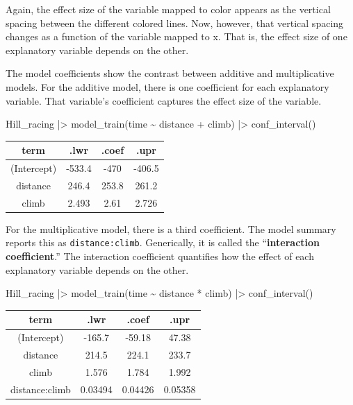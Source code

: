 \documentclass[
  letterpaper,
  DIV=11,
  numbers=noendperiod,
  oneside]{scrartcl}
\newenvironment{Shaded}{\begin{snugshade}}{\end{snugshade}}
\newcommand{\FunctionTok}[1]{\textcolor[rgb]{0.28,0.35,0.67}{#1}}
\newcommand{\NormalTok}[1]{\textcolor[rgb]{0.00,0.23,0.31}{#1}}
\newcommand{\SpecialCharTok}[1]{\textcolor[rgb]{0.37,0.37,0.37}{#1}}
\begin{document}
Again, the effect size of the variable mapped to color appears as the
vertical spacing between the different colored lines. Now, however, that
vertical spacing changes as a function of the variable mapped to x. That
is, the effect size of one explanatory variable depends on the other.

The model coefficients show the contrast between additive and
multiplicative models. For the additive model, there is one coefficient
for each explanatory variable. That variable's coefficient captures the
effect size of the variable.

\begin{Shaded}
\begin{Highlighting}[]
\NormalTok{Hill\_racing }\SpecialCharTok{|\textgreater{}} \FunctionTok{model\_train}\NormalTok{(time }\SpecialCharTok{\textasciitilde{}}\NormalTok{ distance }\SpecialCharTok{+}\NormalTok{ climb) }\SpecialCharTok{|\textgreater{}} \FunctionTok{conf\_interval}\NormalTok{()}
\end{Highlighting}
\end{Shaded}

\begin{longtable}[]{@{}cccc@{}}
\toprule\noalign{}
term & .lwr & .coef & .upr \\
\midrule\noalign{}
\endhead
\bottomrule\noalign{}
\endlastfoot
(Intercept) & -533.4 & -470 & -406.5 \\
distance & 246.4 & 253.8 & 261.2 \\
climb & 2.493 & 2.61 & 2.726 \\
\end{longtable}

For the multiplicative model, there is a third coefficient. The model
summary reports this as \texttt{distance:climb}. Generically, it is
called the ``\textbf{interaction coefficient}.'' The interaction
coefficient quantifies how the effect of each explanatory variable
depends on the other.

\begin{Shaded}
\begin{Highlighting}[]
\NormalTok{Hill\_racing }\SpecialCharTok{|\textgreater{}} \FunctionTok{model\_train}\NormalTok{(time }\SpecialCharTok{\textasciitilde{}}\NormalTok{ distance }\SpecialCharTok{*}\NormalTok{ climb) }\SpecialCharTok{|\textgreater{}} \FunctionTok{conf\_interval}\NormalTok{()}
\end{Highlighting}
\end{Shaded}

\begin{longtable}[]{@{}cccc@{}}
\toprule\noalign{}
term & .lwr & .coef & .upr \\
\midrule\noalign{}
\endhead
\bottomrule\noalign{}
\endlastfoot
(Intercept) & -165.7 & -59.18 & 47.38 \\
distance & 214.5 & 224.1 & 233.7 \\
climb & 1.576 & 1.784 & 1.992 \\
distance:climb & 0.03494 & 0.04426 & 0.05358 \\
\end{longtable}
\end{document}

